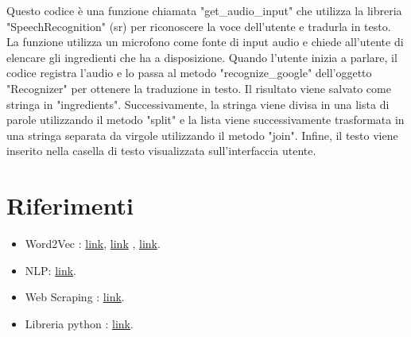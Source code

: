 \documentclass[12pt]{report}
\begin{document}
Questo codice è una funzione chiamata "get\_audio\_input" che utilizza la libreria "SpeechRecognition" (sr) per riconoscere la voce dell'utente e tradurla in testo. La funzione utilizza un microfono come fonte di input audio e chiede all'utente di elencare gli ingredienti che ha a disposizione. Quando l'utente inizia a parlare, il codice registra l'audio e lo passa al metodo "recognize\_google" dell'oggetto "Recognizer" per ottenere la traduzione in testo. Il risultato viene salvato come stringa in "ingredients". Successivamente, la stringa viene divisa in una lista di parole utilizzando il metodo "split" e la lista viene successivamente trasformata in una stringa separata da virgole utilizzando il metodo "join". Infine, il testo viene inserito nella casella di testo visualizzata sull'interfaccia utente.

\chapter{Riferimenti}
\begin{itemize}
\item Word2Vec  : \href{http://nadbordrozd.github.io/blog/2016/05/20/text-classification-with-word2vec/}{link}, \href{https://github.com/TomLin/Playground/blob/master/04-Model-Comparison-Word2vec-Doc2vec-TfIdfWeighted.ipynb}{link} , \href{https://towardsdatascience.com/an-introduction-to-word2vec-in-nlp-854e1c288894}{link}.
\item NLP: \href{https://towardsdatascience.com/nlp-performance-of-different-word-embeddings-on-text-classification-de648c6262b}{link}.
\item Web Scraping : \href{https://realpython.com/beautiful-soup-web-scraper-python/}{link}.
\item Libreria python : \href{ https://github.com/hhursev/recipe-scrapers}{link}.
\end{itemize}
\end{document}
